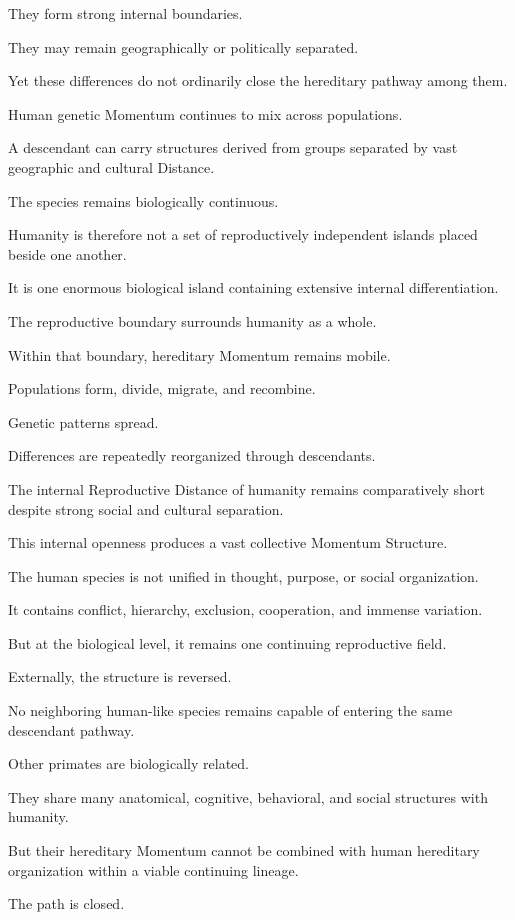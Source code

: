 They form strong internal boundaries.

They may remain geographically or politically separated.

Yet these differences do not ordinarily close the hereditary pathway among them.

Human genetic Momentum continues to mix across populations.

A descendant can carry structures derived from groups separated by vast geographic and cultural Distance.

The species remains biologically continuous.

Humanity is therefore not a set of reproductively independent islands placed beside one another.

It is one enormous biological island containing extensive internal differentiation.

The reproductive boundary surrounds humanity as a whole.

Within that boundary, hereditary Momentum remains mobile.

Populations form, divide, migrate, and recombine.

Genetic patterns spread.

Differences are repeatedly reorganized through descendants.

The internal Reproductive Distance of humanity remains comparatively short despite strong social and cultural separation.

This internal openness produces a vast collective Momentum Structure.

The human species is not unified in thought, purpose, or social organization.

It contains conflict, hierarchy, exclusion, cooperation, and immense variation.

But at the biological level, it remains one continuing reproductive field.

Externally, the structure is reversed.

No neighboring human-like species remains capable of entering the same descendant pathway.

Other primates are biologically related.

They share many anatomical, cognitive, behavioral, and social structures with humanity.

But their hereditary Momentum cannot be combined with human hereditary organization within a viable continuing lineage.

The path is closed.

